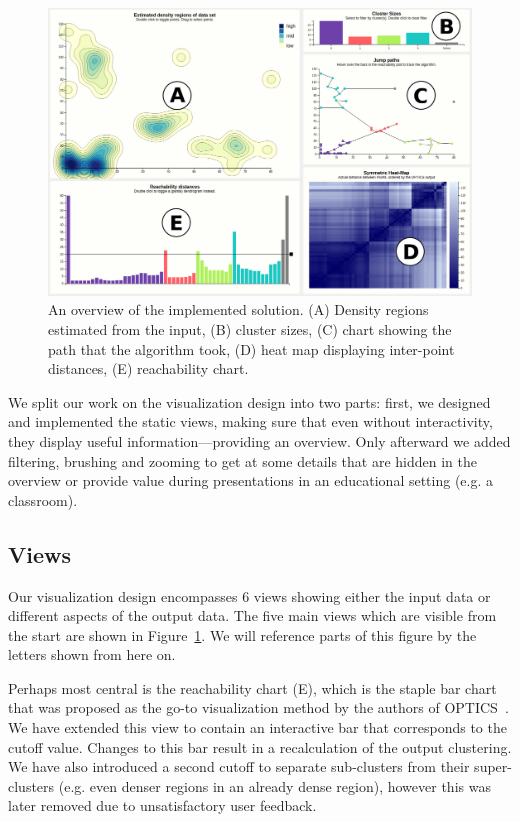 \documentclass{vgtc} %
\begin{document}
\begin{figure}[t]
    \centering
    \includegraphics[width=\columnwidth]{opticsvis-overview}
    \caption{An overview of the implemented solution. (A) Density regions estimated from the input, (B) cluster sizes, (C) chart showing the path that the algorithm took, (D) heat map displaying inter-point distances, (E) reachability chart.}
    \label{fig:overview}
\end{figure}

We split our work on the visualization design into two parts: first, we
designed and implemented the static views, making sure that even without
interactivity, they display useful information---providing an overview. Only
afterward we added filtering, brushing and zooming to get at some details that
are hidden in the overview or provide value during presentations in an
educational setting (e.g. a classroom).

\subsection{Views}

Our visualization design encompasses 6 views showing either the input data or
different aspects of the output data. The five main views which are visible
from the start are shown in Figure~\ref{fig:overview}. We will reference parts
of this figure by the letters shown from here on.

Perhaps most central is the reachability chart (E), which is the staple bar
chart that was proposed as the go-to visualization method by the authors of
OPTICS~\cite{optics}. We have extended this view to contain an interactive bar
that corresponds to the cutoff value.  Changes to this bar result in a
recalculation of the output clustering.  We have also introduced a second
cutoff to separate sub-clusters from their super-clusters (e.g. even denser
regions in an already dense region), however this was later removed due to unsatisfactory
user feedback.
\end{document}
